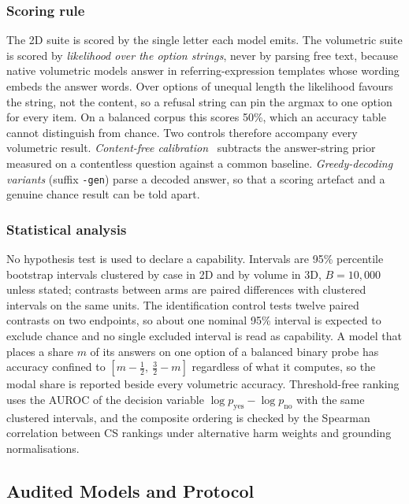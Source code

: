 \subsubsection{Scoring rule} The 2D suite is scored by the single letter each
model emits. The volumetric suite is scored by \emph{likelihood over the
option strings}, never by parsing free text, because native volumetric
models answer in referring-expression templates whose wording embeds the
answer words. Over options of unequal length the likelihood favours the
string, not the content, so a refusal string can
pin the argmax to one option for every item. On a balanced corpus this scores 50\%, which an accuracy table cannot
distinguish from chance. Two controls therefore accompany every volumetric result.
\emph{Content-free calibration}~\cite{zhao2021calibrate} subtracts the answer-string prior measured
on a contentless question against a common baseline. \emph{Greedy-decoding
variants} (suffix \texttt{-gen}) parse a decoded answer, so that a scoring
artefact and a genuine chance result can be told apart.

\subsubsection{Statistical analysis} No hypothesis test is used to declare a capability. Intervals are 95\%
percentile bootstrap intervals clustered by case in 2D and by volume in 3D,
$B=10{,}000$ unless stated; contrasts between arms are paired differences
with clustered intervals on the same units. The identification control tests twelve paired contrasts on two endpoints,
so about one nominal 95\% interval is expected to exclude chance and no
single excluded interval is read as capability. A model that places a share
$m$ of its answers on one option of a balanced binary probe has accuracy
confined to $[m-\tfrac12,\ \tfrac32-m]$ regardless of what it computes, so
the modal share is reported beside every volumetric accuracy. Threshold-free
ranking uses the AUROC of the decision variable $\log p_{\text{yes}}-\log
p_{\text{no}}$ with the same clustered intervals, and the composite ordering
is checked by the Spearman correlation between CS rankings under alternative
harm weights and grounding normalisations.

\subsection{Audited Models and Protocol}
\label{sec:protocol}


